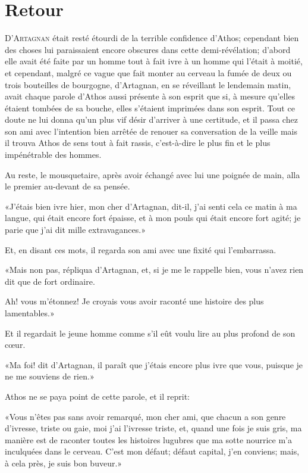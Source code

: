 
\chapter{Retour} 
	
\lettrine{D}{'Artagnan} était resté étourdi de la terrible confidence d'Athos; cependant bien des choses lui paraissaient encore obscures dans cette demi-révélation; d'abord elle avait été faite par un homme tout à fait ivre à un homme qui l'était à moitié, et cependant, malgré ce vague que fait monter au cerveau la fumée de deux ou trois bouteilles de bourgogne, d'Artagnan, en se réveillant le lendemain matin, avait chaque parole d'Athos aussi présente à son esprit que si, à mesure qu'elles étaient tombées de sa bouche, elles s'étaient imprimées dans son esprit. Tout ce doute ne lui donna qu'un plus vif désir d'arriver à une certitude, et il passa chez son ami avec l'intention bien arrêtée de renouer sa conversation de la veille mais il trouva Athos de sens tout à fait rassis, c'est-à-dire le plus fin et le plus impénétrable des hommes. 

Au reste, le mousquetaire, après avoir échangé avec lui une poignée de main, alla le premier au-devant de sa pensée. 

«J'étais bien ivre hier, mon cher d'Artagnan, dit-il, j'ai senti cela ce matin à ma langue, qui était encore fort épaisse, et à mon pouls qui était encore fort agité; je parie que j'ai dit mille extravagances.» 

Et, en disant ces mots, il regarda son ami avec une fixité qui l'embarrassa. 

«Mais non pas, répliqua d'Artagnan, et, si je me le rappelle bien, vous n'avez rien dit que de fort ordinaire. 

\speak  Ah! vous m'étonnez! Je croyais vous avoir raconté une histoire des plus lamentables.» 

Et il regardait le jeune homme comme s'il eût voulu lire au plus profond de son cœur. 

«Ma foi! dit d'Artagnan, il paraît que j'étais encore plus ivre que vous, puisque je ne me souviens de rien.» 

Athos ne se paya point de cette parole, et il reprit: 

«Vous n'êtes pas sans avoir remarqué, mon cher ami, que chacun a son genre d'ivresse, triste ou gaie, moi j'ai l'ivresse triste, et, quand une fois je suis gris, ma manière est de raconter toutes les histoires lugubres que ma sotte nourrice m'a inculquées dans le cerveau. C'est mon défaut; défaut capital, j'en conviens; mais, à cela près, je suis bon buveur.» 

